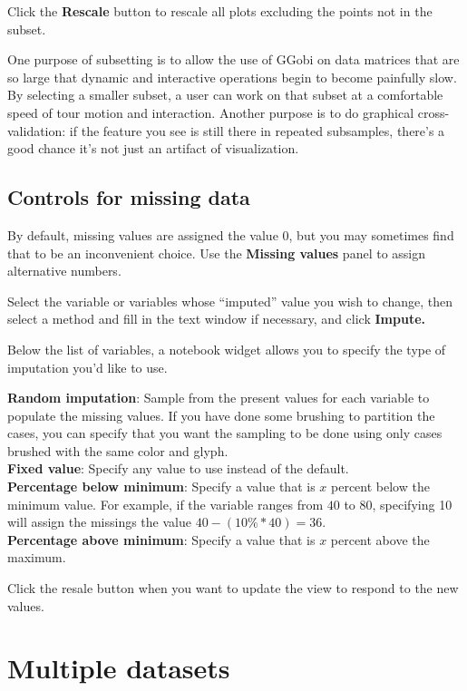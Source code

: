 \documentclass[11pt]{article}
\begin{document}
Click the {\bf Rescale} button to rescale all plots excluding
the points not in the subset.

One purpose of subsetting is to allow the use of GGobi on data matrices
that are so large that dynamic and interactive operations begin to
become painfully slow.  By selecting a smaller subset, a user can
work on that subset at a comfortable speed of tour motion and
interaction.  Another purpose is to do graphical cross-validation:
if the feature you see is still there in repeated subsamples, there's
a good chance it's not just an artifact of visualization.

\subsection{Controls for missing data}
%
By default, missing values are assigned the value $0$, but you
may sometimes find that to be an inconvenient choice.  Use the
{\bf Missing values} panel to assign alternative numbers.

Select the variable or variables whose ``imputed'' value you
wish to change, then select a method and fill in the text window
if necessary, and click {\bf Impute.}

Below the list of variables, a notebook widget allows you to specify
the type of imputation you'd like to use.

{\bf Random imputation}: Sample from the present values for each variable
  to populate the missing values.  If you have done some brushing to
  partition the cases, you can specify that you want the sampling to be
  done using only cases brushed with the same color and glyph.
\\{\bf Fixed value}: Specify any value to use instead of the default.
\\{\bf Percentage below minimum}: Specify a value that is $x$ percent
  below the minimum value.  For example, if the variable ranges from
 $40$ to $80$, specifying 10 will assign the missings the value $40 - (10\%
 * 40) = 36$.
\\{\bf Percentage above minimum}: Specify a value that is $x$ percent
above the maximum.

Click the resale button when you want to update the view to
respond to the new values.

%
%

\section{Multiple datasets}
\end{document}
